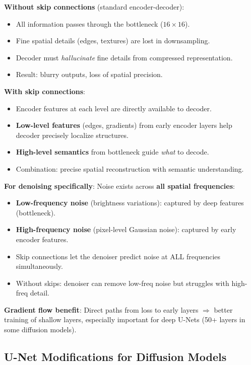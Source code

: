 \begin{keybox}
\textbf{Without skip connections} (standard encoder-decoder):
\begin{itemize}
\item All information passes through the bottleneck ($16{\times}16$).
\item Fine spatial details (edges, textures) are lost in downsampling.
\item Decoder must \emph{hallucinate} fine details from compressed representation.
\item Result: blurry outputs, loss of spatial precision.
\end{itemize}

\textbf{With skip connections}:
\begin{itemize}
\item Encoder features at each level are directly available to decoder.
\item \textbf{Low-level features} (edges, gradients) from early encoder layers help decoder precisely localize structures.
\item \textbf{High-level semantics} from bottleneck guide \emph{what} to decode.
\item Combination: precise spatial reconstruction with semantic understanding.
\end{itemize}

\textbf{For denoising specifically}:
Noise exists across \textbf{all spatial frequencies}:
\begin{itemize}
\item \textbf{Low-frequency noise} (brightness variations): captured by deep features (bottleneck).
\item \textbf{High-frequency noise} (pixel-level Gaussian noise): captured by early encoder features.
\item Skip connections let the denoiser predict noise at ALL frequencies simultaneously.
\item Without skips: denoiser can remove low-freq noise but struggles with high-freq detail.
\end{itemize}

\textbf{Gradient flow benefit}: Direct paths from loss to early layers $\Rightarrow$ better training of shallow layers, especially important for deep U-Nets (50+ layers in some diffusion models).
\end{keybox}

\subsection{U-Net Modifications for Diffusion Models}

